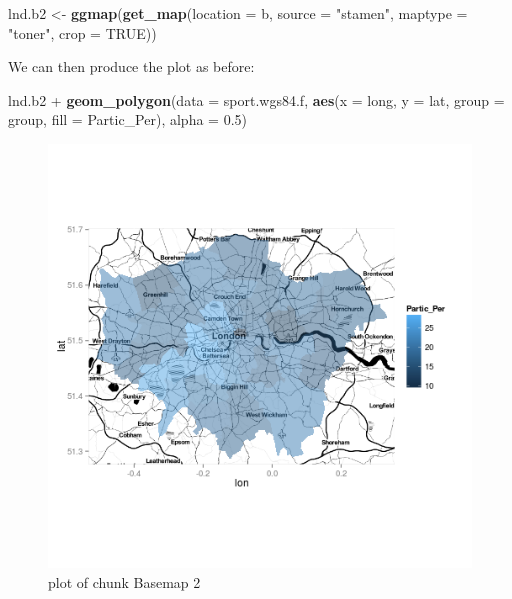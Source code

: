 \documentclass[]{article}
\newenvironment{Shaded}{}{}
\newcommand{\KeywordTok}[1]{\textcolor[rgb]{0.00,0.44,0.13}{\textbf{{#1}}}}
\newcommand{\DataTypeTok}[1]{\textcolor[rgb]{0.56,0.13,0.00}{{#1}}}
\newcommand{\FloatTok}[1]{\textcolor[rgb]{0.25,0.63,0.44}{{#1}}}
\newcommand{\StringTok}[1]{\textcolor[rgb]{0.25,0.44,0.63}{{#1}}}
\newcommand{\OtherTok}[1]{\textcolor[rgb]{0.00,0.44,0.13}{{#1}}}
\newcommand{\NormalTok}[1]{{#1}}
\begin{document}
\begin{Shaded}
\begin{Highlighting}[]
\NormalTok{lnd.b2 <-}\StringTok{ }\KeywordTok{ggmap}\NormalTok{(}\KeywordTok{get_map}\NormalTok{(}\DataTypeTok{location =} \NormalTok{b, }\DataTypeTok{source =} \StringTok{"stamen"}\NormalTok{, }\DataTypeTok{maptype =} \StringTok{"toner"}\NormalTok{, }
    \DataTypeTok{crop =} \OtherTok{TRUE}\NormalTok{))}
\end{Highlighting}
\end{Shaded}

We can then produce the plot as before:

\begin{Shaded}
\begin{Highlighting}[]
\NormalTok{lnd.b2 +}\StringTok{ }\KeywordTok{geom_polygon}\NormalTok{(}\DataTypeTok{data =} \NormalTok{sport.wgs84.f, }\KeywordTok{aes}\NormalTok{(}\DataTypeTok{x =} \NormalTok{long, }\DataTypeTok{y =} \NormalTok{lat, }\DataTypeTok{group =} \NormalTok{group, }
    \DataTypeTok{fill =} \NormalTok{Partic_Per), }\DataTypeTok{alpha =} \FloatTok{0.5}\NormalTok{)}
\end{Highlighting}
\end{Shaded}

\begin{figure}[htbp]
\centering
\includegraphics{figure/Basemap_2.png}
\caption{plot of chunk Basemap 2}
\end{figure}
\end{document}
